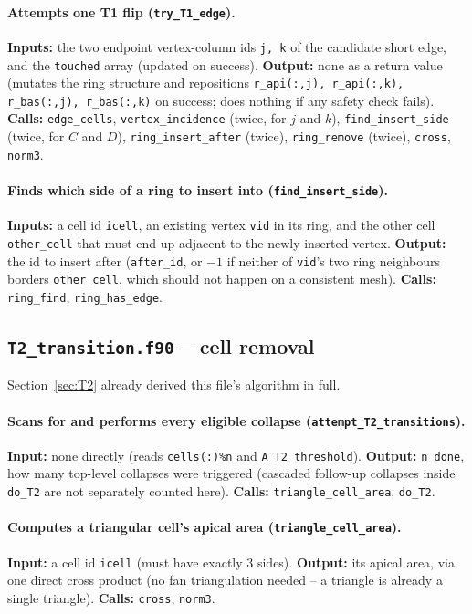 \documentclass[11pt,a4paper]{report}
\begin{document}
\paragraph{Attempts one T1 flip (\texttt{try\_T1\_edge}).}
\textbf{Inputs:} the two endpoint vertex-column ids \texttt{j, k} of
the candidate short edge, and the \texttt{touched} array (updated on
success). \textbf{Output:} none as a return value (mutates the ring
structure and repositions \texttt{r\_api(:,j), r\_api(:,k), r\_bas(:,j),
r\_bas(:,k)} on success; does nothing if any safety check fails).
\textbf{Calls:} \texttt{edge\_cells}, \texttt{vertex\_incidence}
(twice, for $j$ and $k$), \texttt{find\_insert\_side} (twice, for $C$
and $D$), \texttt{ring\_insert\_after} (twice), \texttt{ring\_remove}
(twice), \texttt{cross}, \texttt{norm3}.
\paragraph{Finds which side of a ring to insert into
(\texttt{find\_insert\_side}).} \textbf{Inputs:} a cell id
\texttt{icell}, an existing vertex \texttt{vid} in its ring, and the
other cell \texttt{other\_cell} that must end up adjacent to the newly
inserted vertex. \textbf{Output:} the id to insert after
(\texttt{after\_id}, or $-1$ if neither of \texttt{vid}'s two ring
neighbours borders \texttt{other\_cell}, which should not happen on a
consistent mesh). \textbf{Calls:} \texttt{ring\_find},
\texttt{ring\_has\_edge}.

\subsection{\texttt{T2\_transition.f90} -- cell removal}
Section~\ref{sec:T2} already derived this file's algorithm in full.
\paragraph{Scans for and performs every eligible collapse
(\texttt{attempt\_T2\_transitions}).} \textbf{Input:} none directly
(reads \texttt{cells(:)\%n} and \texttt{A\_T2\_threshold}).
\textbf{Output:} \texttt{n\_done}, how many top-level collapses were
triggered (cascaded follow-up collapses inside \texttt{do\_T2} are not
separately counted here). \textbf{Calls:}
\texttt{triangle\_cell\_area}, \texttt{do\_T2}.
\paragraph{Computes a triangular cell's apical area
(\texttt{triangle\_cell\_area}).} \textbf{Input:} a cell id
\texttt{icell} (must have exactly 3 sides). \textbf{Output:} its
apical area, via one direct cross product (no fan triangulation
needed -- a triangle is already a single triangle).
\textbf{Calls:} \texttt{cross}, \texttt{norm3}.
\end{document}
